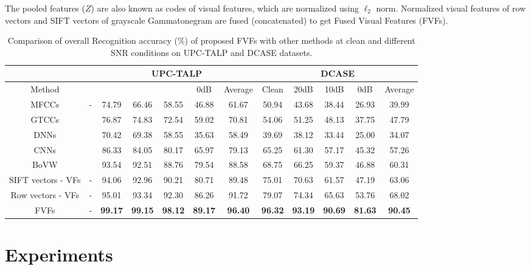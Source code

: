 \documentclass[a4paper]{article}
\begin{document}
The pooled features ($Z$) are also known as codes of visual features, which are normalized using $\ell_2$ norm. Normalized visual features of row vectors and SIFT vectors of grayscale Gammatonegram are fused (concatenated) to get Fused Visual Features (FVFs). 
\label{sec:typestyle}
\begin{table}[ht]
	\caption{Comparison of overall Recognition accuracy (\%) of proposed FVFs with other methods at clean and different SNR conditions on UPC-TALP and DCASE datasets. }
	\scriptsize
	\begin{center}
		\begin{tabular}{|c|c|c|c|c|c|c||c|c|c|c|c|}
			\hline
			\multicolumn{2}{|c|}{} &	\multicolumn{5}{c||}{UPC-TALP}&\multicolumn{5}{c|}{DCASE}\\
			\hline
			Method & \makecell{Ref.}& \makecell{Clean}&\makecell{20dB}& \makecell{10dB}& 0dB & Average & Clean & 20dB & 10dB & 0dB & Average\\
			\hline
			\hline
			MFCCs &-& 74.79& 66.46&58.55&46.88&61.67&50.94& 43.68&38.44&26.93&39.99\\
			\hline
			GTCCs		&\cite{valero2012gammatone} &{76.87} & 74.83& 72.54 & 59.02 & 70.81 &{54.06} & 51.25& 48.13 & 37.75 & 47.79 \\
			\hline
			DNNs &\cite{kong2016deep}& 70.42 & 69.38 & 58.55 & 35.63&58.49& 39.69 & 38.12 & 33.44 & 25.00&34.07\\
			\hline
			CNNs&\cite{li2017comparison}& 86.33 & 84.05 & 80.17 & 65.97&79.13& 65.25 & 61.30 & 57.17 & 45.32&57.26\\
			\hline
			BoVW &\cite{mulimani2018robust}& {93.54} & {92.51} & {88.76} & {79.54} &{88.58}& {68.75} & {66.25} & {59.37} & {46.88} &{60.31}\\
			\hline
			SIFT vectors - VFs &-& {94.06} & {92.96} & {90.21} & {80.71} &{89.48}&{75.01} & {70.63} & {61.57} & {47.19} &{63.06}\\
			\hline
			Row vectors - VFs &-& {95.01} & {93.34} & {92.30} & {86.26} &{91.72}& {79.07} & {74.34} & {65.63} & {53.76} &{68.02}\\
			\hline
			FVFs &-& \textbf{99.17} & \textbf{99.15} & \textbf{98.12} & \textbf{89.17} &\textbf{96.40}& \textbf{96.32} & \textbf{93.19} & \textbf{90.69} & \textbf{81.63} &\textbf{90.45}\\
			\hline
		\end{tabular}
	\end{center}
	\label{table1}
\end{table}   
\section{Experiments}
\label{sec:pagestyle}
\end{document}
